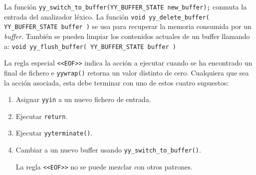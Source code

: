 La funci\'on \verb|yy_switch_to_buffer(YY_BUFFER_STATE new_buffer);| conmuta la entrada 
del analizador l\'exico. La funci\'on \verb|void yy_delete_buffer( YY_BUFFER_STATE buffer )|
se usa para recuperar la memoria consumida por un \emph{buffer}.  Tambi\'en se pueden limpiar 
los contenidos actuales de un buffer llamando a:
\verb|void yy_flush_buffer( YY_BUFFER_STATE buffer )|

La regla especial \verb|<<EOF>>| indica la acci\'on a ejecutar cuando 
se ha encontrado un final de fichero e \verb|yywrap()| retorna un valor
distinto de cero. Cualquiera que sea la acci\'on asociada, esta debe terminar 
con uno de estos cuatro supuestos:
\begin{enumerate}
\item Asignar \verb|yyin| a un nuevo fichero de entrada.
\item Ejecutar \verb|return|.
\item Ejecutar \verb|yyterminate()|.
\item Cambiar a un nuevo buffer usando \verb|yy_switch_to_buffer()|.
    
La regla \verb|<<EOF>>| no se puede mezclar con otros patrones.
\end{enumerate}

